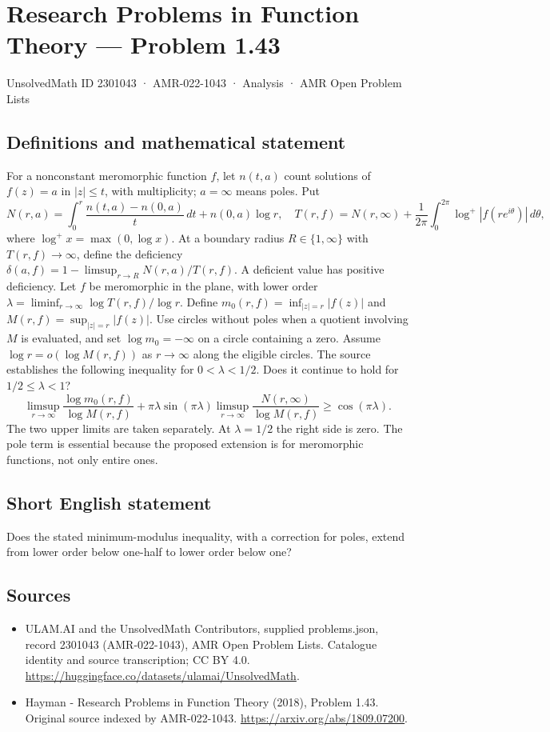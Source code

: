 \documentclass[11pt,a4paper]{article}
\begin{document}
\section*{Research Problems in Function Theory — Problem 1.43}\label{2301043}
{\small UnsolvedMath ID 2301043 · AMR-022-1043 · Analysis · AMR Open Problem Lists}
\subsection{Definitions and mathematical statement}
For a nonconstant meromorphic function $f$, let $n(t,a)$ count solutions of $f(z)=a$ in $|z|\le t$, with multiplicity; $a=\infty$ means poles. Put
\[
N(r,a)=\int_0^r\frac{n(t,a)-n(0,a)}t\,dt+n(0,a)\log r,
\quad T(r,f)=N(r,\infty)+\frac1{2\pi}\int_0^{2\pi}\log^+|f(re^{i\theta})|\,d\theta,
\]
where $\log^+x=\max(0,\log x)$. At a boundary radius $R\in\{1,\infty\}$ with $T(r,f)\to\infty$, define the deficiency
$\delta(a,f)=1-\limsup_{r\to R}N(r,a)/T(r,f)$. A deficient value has positive deficiency.
Let $f$ be meromorphic in the plane, with lower order
$\lambda=\liminf_{r\to\infty}\log T(r,f)/\log r$. Define
$m_0(r,f)=\inf_{|z|=r}|f(z)|$ and $M(r,f)=\sup_{|z|=r}|f(z)|$.
Use circles without poles when a quotient involving $M$ is evaluated, and set $\log m_0=-\infty$ on a circle containing a zero. Assume
$\log r=o(\log M(r,f))$ as $r\to\infty$ along the eligible circles.
The source establishes the following inequality for $0<\lambda<1/2$. Does it continue to hold for $1/2\le\lambda<1$?
\[
\limsup_{r\to\infty}\frac{\log m_0(r,f)}{\log M(r,f)}
+\pi\lambda\sin(\pi\lambda)
\limsup_{r\to\infty}\frac{N(r,\infty)}{\log M(r,f)}
\ge\cos(\pi\lambda).
\]
The two upper limits are taken separately. At $\lambda=1/2$ the right side is zero. The pole term is essential because the proposed extension is for meromorphic functions, not only entire ones.
\subsection{Short English statement}
Does the stated minimum-modulus inequality, with a correction for poles, extend from lower order below one-half to lower order below one?
\subsection{Sources}
\begin{itemize}
\item[S1] ULAM.AI and the UnsolvedMath Contributors, supplied problems.json, record 2301043 (AMR-022-1043), AMR Open Problem Lists. Catalogue identity and source transcription; CC BY 4.0.
\url{https://huggingface.co/datasets/ulamai/UnsolvedMath}.
\item[S2] Hayman - Research Problems in Function Theory (2018), Problem 1.43. Original source indexed by AMR-022-1043.
\url{https://arxiv.org/abs/1809.07200}.
\end{itemize}
\end{document}
